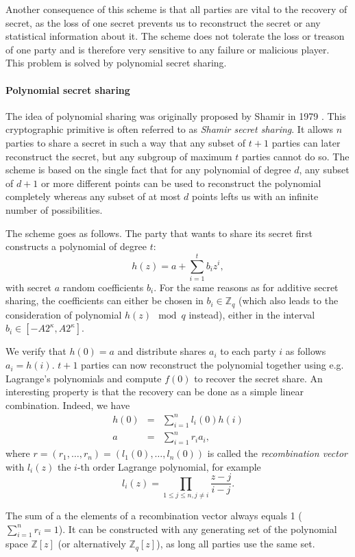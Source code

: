 Another consequence of this scheme is that all parties are vital to the recovery of secret, as the loss of one secret prevents us to reconstruct the secret or any statistical information about it. The scheme does not tolerate the loss or treason of one party and is therefore very sensitive to any failure or malicious player. This problem is solved by polynomial secret sharing.

\paragraph{Polynomial secret sharing}
The idea of polynomial sharing was originally proposed by Shamir in 1979 \cite{Shamir1979HowSecret}. This cryptographic primitive is often referred to as \emph{Shamir secret sharing}. It allows $n$ parties to share a secret in such a way that any subset of $t+1$ parties can later reconstruct the secret, but any subgroup of maximum $t$ parties cannot do so. The scheme is based on the single fact that for any polynomial of degree $d$, any subset of $d+1$ or more different points can be used to reconstruct the polynomial completely whereas any subset of at most $d$ points lefts us with an infinite number of possibilities.

The scheme goes as follows. The party that wants to share its secret first constructs a polynomial of degree $t$:
\begin{equation}
    h(z) = a + \sum_{i=1}^t b_i z^i,
\end{equation}
with secret $a$ random coefficients $b_i$. For the same reasons as for additive secret sharing, the coefficients can either be chosen in $b_i \in \mathbb{Z}_q$ (which also leads to the consideration of polynomial $h(z) \mod q$ instead), either in the interval $b_i \in \left[-A2^\kappa,A2^\kappa\right]$.

We verify that $h(0)=a$ and distribute shares $a_i$ to each party $i$ as follows $a_i=h(i)$. $t+1$ parties can now reconstruct the polynomial together using e.g. Lagrange's polynomials and compute $f(0)$ to recover the secret share. An interesting property is that the recovery can be done as a simple linear combination. Indeed, we have
\begin{eqnarray}
    h(0) &=& \sum_{i=1}^{n} l_i(0)h(i) \\
    a &=& \sum_{i=1}^{n} r_ia_i,
    \label{eqn:recover-secret}
\end{eqnarray}
where $r = \left(r_1, \ldots , r_n\right) = \left(l_1(0), \ldots , l_n(0)\right)$ is called the \emph{recombination vector} with $l_i(z)$ the $i$-th order Lagrange polynomial, for example
\begin{equation*}
    l_i(z) = \prod_{1\leq j \leq n,j\neq i}\frac{z-j}{i-j}.
\end{equation*}

The sum of a the elements of a recombination vector always equals 1 ($\sum_{i=1}^n r_i=1$). It can be constructed with any generating set of the polynomial space $\mathbb{Z}\left[z\right]$ (or alternatively $\mathbb{Z}_q\left[z\right]$), as long all parties use the same set.